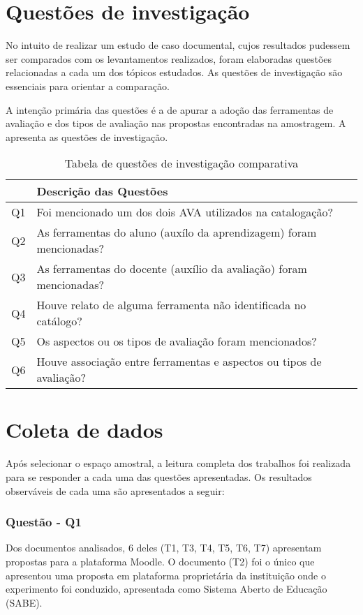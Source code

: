 \section{Questões de investigação}%

No intuito de realizar um estudo de caso documental, cujos resultados pudessem ser comparados com os levantamentos realizados, foram elaboradas questões relacionadas a cada um dos tópicos estudados. As questões de investigação são essenciais para orientar a comparação. 

A intenção primária das questões é a de apurar a adoção das ferramentas de avaliação e dos tipos de avaliação nas propostas encontradas na amostragem. A  apresenta as questões de investigação.

\begin{table}[ht!]
\setlength{\bigstrutjot}{3pt}
\caption{Tabela de questões de investigação comparativa}
\label{tab:question}
\centering
    \begin{tabular}{|l|l|}
    \hline 
        \bigstrut
         & {Descrição das Questões}  \\
    	\hline
        \bigstrut[t]
        Q1	& Foi mencionado um dos dois AVA utilizados na catalogação?\\ 	
        Q2  & As ferramentas do aluno (auxílo da aprendizagem) foram mencionadas?\\      
        Q3  & As ferramentas do docente (auxílio da avaliação) foram mencionadas?\\
        Q4  & Houve relato de alguma ferramenta não identificada no catálogo?\\          
        Q5  & Os aspectos ou os tipos de avaliação foram mencionados?\\         
        \bigstrut[b]
        Q6  & Houve associação entre ferramentas e aspectos ou tipos de avaliação?\\
    \hline
    \end{tabular}
\end{table}

\section{Coleta de dados}%

Após selecionar o espaço amostral, a leitura completa dos trabalhos foi realizada para se responder a cada uma das questões apresentadas. Os resultados observáveis de cada uma são apresentados a seguir:

\subsubsection{Questão - Q1}
Dos documentos analisados, 6 deles (T1, T3, T4, T5, T6, T7) apresentam propostas para a plataforma Moodle. O documento (T2) foi o único que apresentou uma proposta em plataforma proprietária da instituição onde o experimento foi conduzido, apresentada como Sistema Aberto de Educação (SABE).


